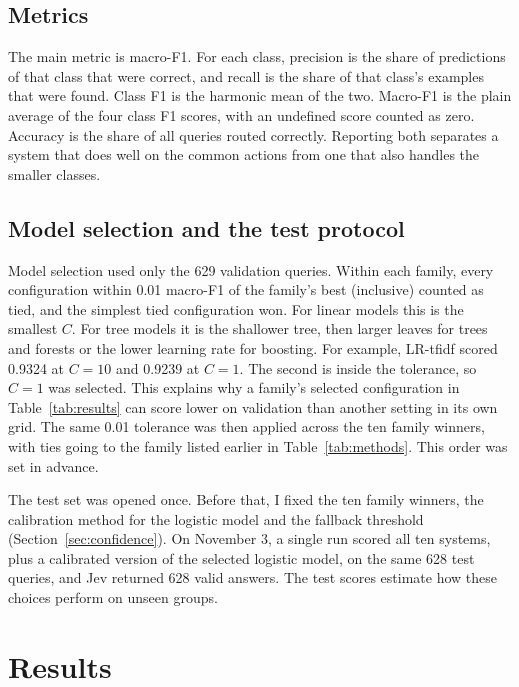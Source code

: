 \documentclass[conference]{IEEEtran}
\begin{document}
\subsection{Metrics}
The main metric is macro-F1. For each class, precision is the share of predictions of that class that were correct, and recall is the share of that class's examples that were found. Class F1 is the harmonic mean of the two. Macro-F1 is the plain average of the four class F1 scores, with an undefined score counted as zero. Accuracy is the share of all queries routed correctly. Reporting both separates a system that does well on the common actions from one that also handles the smaller classes.

\subsection{Model selection and the test protocol}
Model selection used only the 629 validation queries. Within each family, every configuration within 0.01 macro-F1 of the family's best (inclusive) counted as tied, and the simplest tied configuration won. For linear models this is the smallest \(C\). For tree models it is the shallower tree, then larger leaves for trees and forests or the lower learning rate for boosting. For example, LR-tfidf scored 0.9324 at \(C=10\) and 0.9239 at \(C=1\). The second is inside the tolerance, so \(C=1\) was selected. This explains why a family's selected configuration in Table~\ref{tab:results} can score lower on validation than another setting in its own grid. The same 0.01 tolerance was then applied across the ten family winners, with ties going to the family listed earlier in Table~\ref{tab:methods}. This order was set in advance.

The test set was opened once. Before that, I fixed the ten family winners, the calibration method for the logistic model and the fallback threshold (Section~\ref{sec:confidence}). On November 3, a single run scored all ten systems, plus a calibrated version of the selected logistic model, on the same 628 test queries, and Jev returned 628 valid answers. The test scores estimate how these choices perform on unseen groups.

\section{Results}\label{sec:results}
\end{document}
